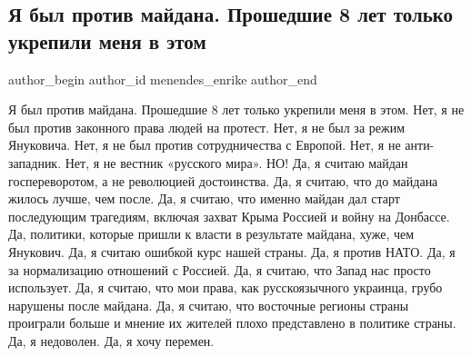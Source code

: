  
 
 
 
 
 
\subsection{Я был против майдана. Прошедшие 8 лет только укрепили меня в этом}
\label{sec:21_11_2021.fb.menendes_enrike.1.maidan}
 
\ifcmt
 author_begin
   author_id menendes_enrike
 author_end
\fi

\obeycr
Я был против майдана. Прошедшие 8 лет только укрепили меня в этом.
Нет, я не был против законного права людей на протест.
Нет, я не был за режим Януковича.
Нет, я не был против сотрудничества с Европой.
Нет, я не анти-западник.
Нет, я не вестник «русского мира».
НО!
Да, я считаю майдан госпереворотом, а не революцией достоинства.
Да, я считаю, что до майдана жилось лучше, чем после.
Да, я считаю, что именно майдан дал старт последующим трагедиям, включая захват Крыма Россией и войну на Донбассе.
Да, политики, которые пришли к власти в результате майдана, хуже, чем Янукович.
Да, я считаю ошибкой курс нашей страны.
Да, я против НАТО.
Да, я за нормализацию отношений с Россией.
Да, я считаю, что Запад нас просто использует.
Да, я считаю, что мои права, как русскоязычного украинца, грубо нарушены после майдана.
Да, я считаю, что восточные регионы страны проиграли больше и мнение их жителей плохо представлено в политике страны.
Да, я недоволен.
Да, я хочу перемен.
\restorecr

